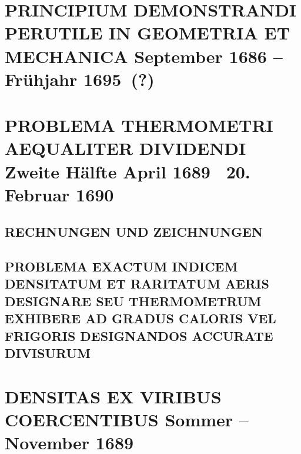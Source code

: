 \documentclass[%
fontsize=10pt,
]{scrbook}
\DeclareRobustCommand{\bracks}[1]{%
\textup{\lbrack}#1\textup{\rbrack}}
\begin{document}
\chapter[tocentry={Principium demonstrandi perutile in geometria et mechanica
\enskip%
\bracks{September 1686 -- Frühjahr 1695~(?)}},
head={Principium demonstrandi perutile}]%
{\MakeUppercase{Principium demonstrandi perutile in geometria et mechanica%
}
\newline%
\bracks{September 1686 -- Frühjahr 1695~(?)}}
\label{39978}




\chapter[tocentry={Problema thermometri aequaliter dividendi
\enskip \lbrack Zweite Hälfte April 1689 \textendash\ 20. Februar 1690\rbrack},
head={Problema thermometri aequaliter dividendi}]%
{\MakeUppercase{Problema thermometri aequaliter dividendi}
\newline \lbrack Zweite Hälfte April 1689 \textendash\ 20. Februar 1690\rbrack}
\label{60270+RK60326}

\section[tocentry={Rechnungen und Zeichnungen},
head={Rechnungen und Zeichnungen}]%
{\MakeUppercase{Rechnungen und Zeichnungen}}
\label{60326}

\section[tocentry={Problema exactum indicem densitatum et raritatum aeris designare seu thermometrum exhibere ad gradus caloris vel frigoris designandos accurate divisurum},
head={Problema exactum Indicem densitatum et raritatum Aeris designare}]%
{\MakeUppercase{Problema exactum indicem densitatum et raritatum aeris designare seu thermometrum exhibere ad gradus caloris vel frigoris designandos accurate divisurum}}
\label{60270}




\chapter[tocentry={Densitas ex viribus coercentibus %
\enskip%
\bracks{%
Sommer -- November
1689}}, %
head={Densitas ex viribus coercentibus%
}]%
{\MakeUppercase{Densitas ex viribus coercentibus} %
\newline%
\bracks{%
Sommer -- November
1689}%
}%
\label{58656-A}

\end{document}
